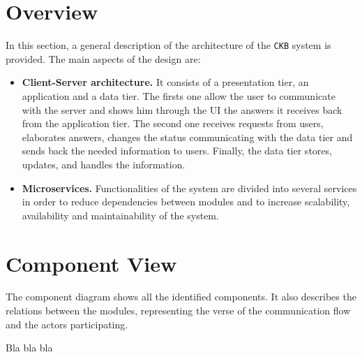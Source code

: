 \section{Overview}
\label{sec: overview}%
In this section, a general description of the architecture of the \verb|CKB| system is provided.
The main aspects of the design are:
\begin{itemize}
    \item \textbf{Client-Server architecture. } It consists of a presentation tier, an application and a data tier.
    The firsts one allow the user to communicate with the server and shows him through the UI the answers it receives back from the application tier.
    The second one receives requests from users, elaborates answers, changes the status communicating with the data tier and sends back the needed information to users.
    Finally, the data tier stores, updates, and handles the information.
    \item \textbf{Microservices. } Functionalities of the system are divided into several services in order to reduce dependencies between
    modules and to increase scalability, availability and maintainability of the system.
\end{itemize}

\section{Component View}
\label{sec: component_view}%
The component diagram shows all the identified components.
It also describes the relations between the modules, representing the verse of the communication flow and the actors participating.

Bla bla bla

